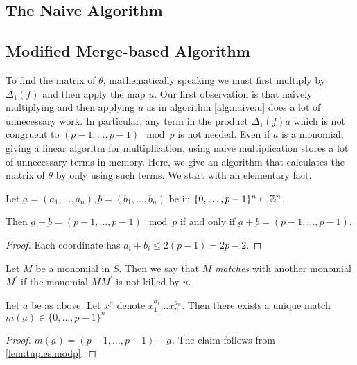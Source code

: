 
\subsection{The Naive Algorithm}

\subsection{Modified Merge-based Algorithm}

To find the matrix of \(\theta\), mathematically
speaking we must first multiply by \(\Delta_{1}(f)\) 
and then apply the map \(u\).
Our first observation is that naively 
multiplying and then applying \(u\) 
as in algorithm \ref{alg:naive:u}
does a lot of unnecessary work.
In particular, any term in the 
product \(\Delta_{1}(f)a\) which 
is not congruent to 
\((p-1, \ldots, p-1) \mod p\)
is not needed. 
Even if \(a\) is a monomial, giving a linear
algoritm for multiplication, using naive
multiplication stores a lot of unnecessary terms
in memory.
Here, we give an algorithm that calculates
the matrix of \(\theta\) by only
using such terms.
We start with an elementary fact.

\begin{lem}
	\label{lem:tuples:modp}
	Let \(\underbar{a} = (a_{1}, \ldots, a_{n}),
	\underbar{b} = (b_{1}, \ldots, b_{n})\)
	be in \(\{0, \ldots, p-1\}^{n} \subset \mathbb{Z}^{n}\).

	Then \(\underbar{a} + \underbar{b} = 
	(p-1, \ldots, p-1) \mod p\)
	if and only if 
	\(\underbar{a} + \underbar{b} = 
	(p-1, \ldots, p-1)\).
\end{lem}

\begin{proof}
	Each coordinate has \(a_{i} + b_{i} \leq 2(p-1) = 2p-2\).
\end{proof}

\begin{defn}
	Let \(M\) be a monomial in \(S\). 
	Then we say that \(M\) \textit{matches}
	with another monomial \(M^{\prime}\) 
	if the monomial \(MM^{\prime}\) is
	not killed by \(u\).
\end{defn}

\begin{cor}
	Let \(\underbar{a}\) be as above.
	Let \(\underbar{x}^{\underbar{a}}\)
	denote \(x_{1}^{a_{1}} \ldots x_{n}^{a_{n}}\).
	Then there exists a unique
	match \(m(\underbar{a}) \in \{0, \ldots, p-1\}^{n}\) 
\end{cor}

\begin{proof}
	\(m(\underbar{a}) = 
	(p-1, \ldots, p-1) - \underbar{a}\).
	The claim follows from 
	\ref{lem:tuples:modp}.
\end{proof}

